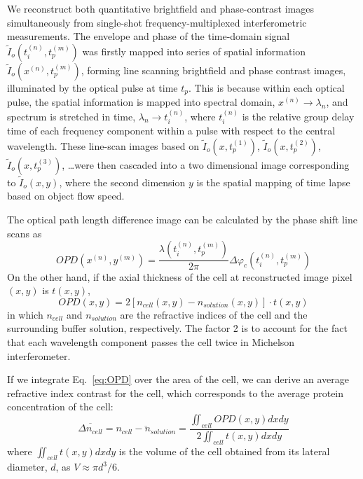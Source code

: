\documentclass[aps,pra,reprint,superscriptaddress]{revtex4-1}
\begin{document}
We reconstruct both quantitative brightfield and phase-contrast images simultaneously from single-shot frequency-multiplexed interferometric measurements. The envelope and phase of the time-domain signal $\tilde{I}_o (t_i^{(n)}, t_p^{(m)})$ was firstly mapped into series of spatial information $\tilde{I}_o(x^{(n)},t_p^{(m)})$, forming line scanning brightfield and phase contrast images, illuminated by the optical pulse at time $t_p$. This is because within each optical pulse, the spatial information is mapped into spectral domain, $x^{(n)} \rightarrow \lambda_n$, and spectrum is stretched in time, $\lambda_n \rightarrow t_i^{(n)}$, where $t_i^{(n)}$ is the relative group delay time of each frequency component within a pulse with respect to the central wavelength. These line-scan images based on $\tilde{I}_o(x,t_p^{(1)})$, $\tilde{I}_o (x, t_p^{(2)})$, $\tilde{I}_o(x,t_p^{(3)})$, \ldots were then cascaded into a two dimensional image corresponding to $\tilde{I}_o(x,y)$, where the second dimension $y$ is the spatial mapping of time lapse based on object flow speed. 

The optical path length difference image can be calculated by the phase shift line scans as
\begin{equation}
OPD(x^{(n)},y^{(m)}) = \frac{\lambda(t_i^{(n)},t_p^{(m)})}{2\pi} \Delta\varphi_c(t_i^{(n)},t_p^{(m)})
\end{equation}
On the other hand, if the axial thickness of the cell at reconstructed image pixel $(x,y)$ is $t(x,y)$,
\begin{equation} \label{eq:OPD}
OPD(x,y) = 2 [n_{cell}(x,y) - n_{solution}(x,y)] \cdot t(x,y)
\end{equation}
in which $n_{cell}$ and $n_{solution}$ are the refractive indices of the cell and the surrounding buffer solution, respectively. The factor 2 is to account for the fact that each wavelength component passes the cell twice in Michelson interferometer. 

If we integrate Eq.~\ref{eq:OPD} over the area of the cell, we can derive an average refractive index contrast for the cell, which corresponds to the average protein concentration of the cell:
\begin{equation}
\overline{\Delta n_{cell}} = \overline{n_{cell} - n_{solution}} = \frac{\iint_{cell} OPD(x,y) dx dy}{2 \iint_{cell} t(x,y) dx dy}
\end{equation}
where $\iint_{cell} t(x,y) dx dy$ is the volume of the cell obtained from its lateral diameter, $d$, as $V \approx \pi d^3/6$. 
\end{document}

